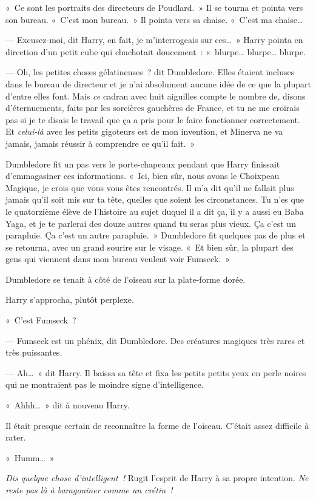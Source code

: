 «~Ce sont les portraits des directeurs de Poudlard.~»
Il se tourna et pointa vers son bureau.
«~C'est mon bureau.~»
Il pointa vers sa chaise.
«~C'est ma chaise…

--- Excusez-moi, dit Harry, en fait, je m'interrogeais sur ces…~»
Harry pointa en direction d'un petit cube qui chuchotait doucement~: «~blurpe… blurpe… blurpe.

--- Oh, les petites choses gélatineuses~? dit Dumbledore.
Elles étaient incluses dans le bureau de directeur et je n'ai absolument aucune idée de ce que la plupart d'entre elles font.
Mais \emph{ce} cadran avec huit aiguilles compte le nombre de, disons d'éternuements, faits par les sorcières gauchères de France, et tu ne me croirais pas si je te disais le travail que ça a pris pour le faire fonctionner correctement.
Et \emph{celui-là} avec les petits gigoteurs est de mon invention, et Minerva ne va jamais, jamais réussir à comprendre ce qu'il fait.~»

Dumbledore fit un pas vers le porte-chapeaux pendant que Harry finissait d'emmagasiner ces informations.
«~Ici, bien sûr, nous avons le Choixpeau Magique, je crois que vous vous êtes rencontrés.
Il m'a dit qu'il ne fallait plus jamais qu'il soit mis sur ta tête, quelles que soient les circonstances.
Tu n'es que le quatorzième élève de l'histoire au sujet duquel il a dit ça, il y a aussi eu Baba Yaga, et je te parlerai des douze autres quand tu seras plus vieux.
Ça c'est un parapluie.
Ça c'est un autre parapluie.~»
Dumbledore fit quelques pas de plus et se retourna, avec un grand sourire sur le visage.
«~Et bien sûr, la plupart des gens qui viennent dans mon bureau veulent voir Fumseck.~»

Dumbledore se tenait à côté de l'oiseau sur la plate-forme dorée.

Harry s'approcha, plutôt perplexe.

«~C'est Fumseck~?

--- Fumseck est un phénix, dit Dumbledore.
Des créatures magiques très rares et très puissantes.

--- Ah…~» dit Harry.
Il baissa sa tête et fixa les petits petits yeux en perle noires qui ne montraient pas le moindre signe d'intelligence.

«~Ahhh…~» dit à nouveau Harry.

Il était presque certain de reconnaître la forme de l'oiseau.
C'était assez difficile à rater.

«~Humm…~»

\emph{Dis quelque chose d'intelligent~!} Rugit l'esprit de Harry à sa propre intention.
\emph{Ne reste pas là à baragouiner comme un crétin~!}

